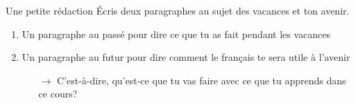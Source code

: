 \begin{frame}{Une petite rédaction}
  Écris deux paragraphes au sujet des vacances et ton avenir.
  \begin{enumerate}
    \item Un paragraphe \alert{au passé} pour dire ce que tu as fait pendant les vacances
    \item Un paragraphe \alert{au futur} pour dire comment le français te sera utile à l'avenir
    \begin{itemize}
      \item[$\to$] C'est-à-dire, qu'est-ce que tu vas faire avec ce que tu apprends dans ce cours?
    \end{itemize}
  \end{enumerate}
\end{frame}
